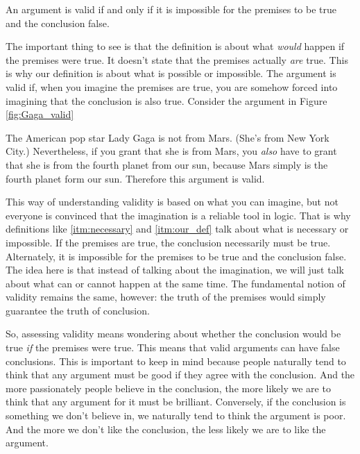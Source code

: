   An argument is valid if and only if it is impossible for the premises to be true and the conclusion false.

The important thing to see is that the definition is about what \textit{would} happen if the premises were true. It doesn't state that the premises actually \textit{are} true. This is why our definition is about what is possible or impossible. The argument is valid if, when you imagine the premises are true, you are somehow forced into imagining that the conclusion is also true. Consider the argument in Figure \ref{fig:Gaga_valid}


\begin{kormanize}
\end{kormanize}

The American pop star Lady Gaga is not from Mars. (She's from New York City.) Nevertheless, if you grant that she is from Mars, you \emph{also} have to grant that she is from the fourth planet from our sun, because Mars simply is the fourth planet form our sun. Therefore this argument is valid.

This way of understanding validity is based on what you can imagine, but not everyone is convinced that the imagination is a reliable tool in logic. That is why definitions like \ref{itm:necessary} and \ref{itm:our_def} talk about what is necessary or impossible. If the premises are true, the conclusion necessarily must be true. Alternately, it is impossible for the premises to be true and the conclusion false. The idea here is that instead of talking about the imagination, we will just talk about what can or cannot happen at the same time. The fundamental notion of validity remains the same, however: the truth of the premises would simply guarantee the truth of conclusion.

So, assessing validity means wondering about whether the conclusion would be true \textit{if} the premises were true. This means that valid arguments can have false conclusions. This is important to keep in mind because people naturally tend to think that any argument must be good if they agree with the conclusion. And the more passionately people believe in the conclusion, the more likely we are to think that any argument for it must be brilliant. Conversely, if the conclusion is something we don't believe in, we naturally tend to think the argument is poor. And the more we don't like the conclusion, the less likely we are to like the argument.

